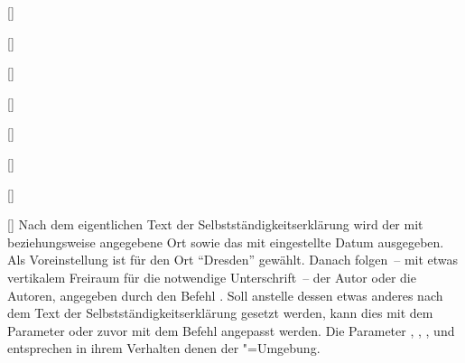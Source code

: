 \begin{Declaration*}{}
\begin{Declaration*}{}
\begin{Declaration*}{}
\begin{Declaration}{}
\begin{Declaration}{[]}
\begin{Declaration}{[]}
\begin{Declaration}{[]}
\begin{Declaration}{[]}
\begin{Declaration}[v2.02]{%
  []%
}
\begin{Declaration}[v2.02]{%
  []%
}
\begin{Declaration}[v2.02]{%
  []%
}
\begin{Declaration}{[\PSet]}
Nach dem eigentlichen Text der Selbstständigkeitserklärung wird der mit 
 beziehungsweise  angegebene Ort 
sowie das mit  eingestellte Datum ausgegeben. Als Voreinstellung 
ist für den Ort \enquote{Dresden} gewählt. Danach folgen~-- mit etwas 
vertikalem Freiraum für die notwendige Unterschrift~-- der Autor oder die 
Autoren, angegeben durch den Befehl . Soll anstelle dessen etwas 
anderes nach dem Text der Selbstständigkeitserklärung gesetzt werden, kann dies 
mit dem Parameter  oder zuvor mit dem 
Befehl  angepasst werden. Die Parameter 
, 
, 
, 
 und 
 entsprechen in ihrem Verhalten denen 
der "=Umgebung.
\end{Declaration}
\end{Declaration}
\end{Declaration}
\end{Declaration}
\end{Declaration}
\end{Declaration}
\end{Declaration}
\end{Declaration}
\end{Declaration}


\end{Declaration*}
\end{Declaration*}
\end{Declaration*}
